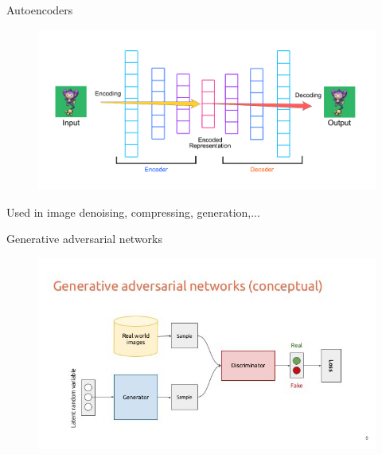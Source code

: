 \documentclass[handout, 10pt]{beamer}
\begin{document}
\begin{frame}{Autoencoders}
    \begin{figure}
        \centering
        \includegraphics[width=.9\textwidth]{fig/L2/AE.png}

    \end{figure}
\alert{Used in image denoising, compressing, generation,...}
    
\end{frame}

\begin{frame}{Generative adversarial networks}
    \begin{figure}
        \centering
    \includegraphics[width=.9\textwidth]{fig/L2/GAN.png}
  \end{figure}
    
\end{frame}
\end{document}
